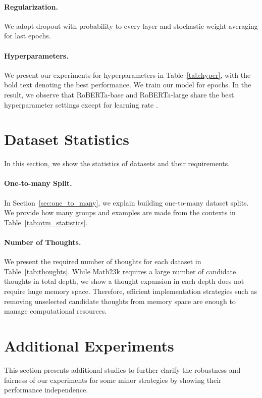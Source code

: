 \documentclass[11pt]{article}
\newcommand{\1}{\mathbb{1}}
\begin{document}
\paragraph{Regularization.}
We adopt dropout with probability  to every layer and
stochastic weight averaging \citep{izmailov-etal-2018-averaging} for last  epochs.


\paragraph{Hyperparameters.}
We present our experiments for hyperparameters in Table~\ref{tab:hyper},
with the bold text denoting the best performance.
We train our model for  epochs.
In the result, we observe that RoBERTa-base and RoBERTa-large share the best hyperparameter settings except for learning rate .


\section{Dataset Statistics}
In this section, we show the statistics of datasets and their requirements.

\paragraph{One-to-many Split.}
In Section~\ref{sec:one_to_many}, we explain building one-to-many dataset splits.
We provide how many groups and examples are made from the contexts in Table~\ref{tab:otm_statistics}.

\paragraph{Number of Thoughts.}
We present the required number of thoughts for each dataset in Table~\ref{tab:thoughts}.
While Math23k requires a large number of candidate thoughts in total depth, we show a thought expansion in each depth does not require huge memory space. Therefore, efficient implementation strategies such as removing unselected candidate thoughts from memory space are enough to manage computational resources.

\section{Additional Experiments}
This section presents additional studies to further clarify the robustness and fairness of our experiments for some minor strategies by showing their performance independence.
\end{document}
